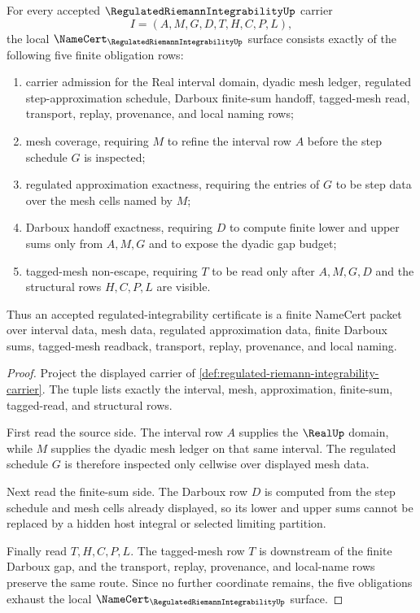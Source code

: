 \begin{theorem}
\label{thm:regulated-riemann-integrability-namecert-obligations}
For every accepted $\RegulatedRiemannIntegrabilityUp$ carrier
$$
I=(A,M,G,D,T,H,C,P,L),
$$
the local $\NameCert_{\RegulatedRiemannIntegrabilityUp}$ surface consists exactly of the following five finite obligation rows:
\begin{enumerate}
\item carrier admission for the Real interval domain, dyadic mesh ledger, regulated step-approximation schedule, Darboux finite-sum handoff, tagged-mesh read, transport, replay, provenance, and local naming rows;
\item mesh coverage, requiring $M$ to refine the interval row $A$ before the step schedule $G$ is inspected;
\item regulated approximation exactness, requiring the entries of $G$ to be step data over the mesh cells named by $M$;
\item Darboux handoff exactness, requiring $D$ to compute finite lower and upper sums only from $A,M,G$ and to expose the dyadic gap budget;
\item tagged-mesh non-escape, requiring $T$ to be read only after $A,M,G,D$ and the structural rows $H,C,P,L$ are visible.
\end{enumerate}
Thus an accepted regulated-integrability certificate is a finite NameCert packet over interval data, mesh data, regulated approximation data, finite Darboux sums, tagged-mesh readback, transport, replay, provenance, and local naming.
\end{theorem}
\begin{proof}
Project the displayed carrier of \autoref{def:regulated-riemann-integrability-carrier}. The tuple lists exactly the interval, mesh, approximation, finite-sum, tagged-read, and structural rows.

First read the source side. The interval row $A$ supplies the $\RealUp$ domain, while $M$ supplies the dyadic mesh ledger on that same interval. The regulated schedule $G$ is therefore inspected only cellwise over displayed mesh data.

Next read the finite-sum side. The Darboux row $D$ is computed from the step schedule and mesh cells already displayed, so its lower and upper sums cannot be replaced by a hidden host integral or selected limiting partition.

Finally read $T,H,C,P,L$. The tagged-mesh row $T$ is downstream of the finite Darboux gap, and the transport, replay, provenance, and local-name rows preserve the same route. Since no further coordinate remains, the five obligations exhaust the local $\NameCert_{\RegulatedRiemannIntegrabilityUp}$ surface.
\end{proof}

